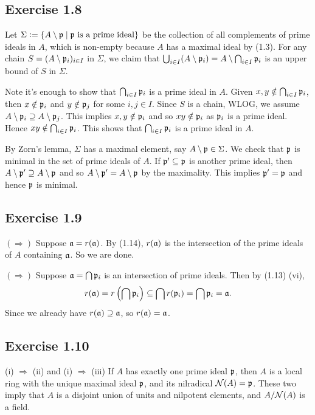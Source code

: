 \documentclass[../A&M.tex]{subfiles}
\begin{document}
\subsection*{Exercise 1.8}

Let $\Sigma:=\{A\setminus\mathfrak{p} \mid \mathfrak{p} \text{ is a prime ideal}\}$ be the collection of all complements of prime ideals in $A$, which is non-empty because $A$ has a maximal ideal by (1.3). For any chain $S=(A\setminus\mathfrak{p}_i)_{i\in I}$ in $\Sigma$, we claim that $\bigcup_{i\in I} (A\setminus\mathfrak{p}_i) = A\setminus \bigcap_{i\in I} \mathfrak{p}_i$ is an upper bound of $S$ in $\Sigma$.

Note it's enough to show that $\bigcap_{i\in I} \mathfrak{p}_i$ is a prime ideal in $A$. Given $x,y \notin \bigcap_{i\in I} \mathfrak{p}_i$, then $x\notin \mathfrak{p}_i$ and $y\notin\mathfrak{p}_j$ for some $i,j\in I$. Since $S$ is a chain, WLOG, we assume $A\setminus\mathfrak{p}_i \supseteq A\setminus\mathfrak{p}_j$. This implies $x,y\notin \mathfrak{p}_i$ and so $xy\notin\mathfrak{p}_i$ as $\mathfrak{p}_i$ is a prime ideal. Hence $xy\notin \bigcap_{i\in I} \mathfrak{p}_i$. This shows that $\bigcap_{i\in I} \mathfrak{p}_i$ is a prime ideal in $A$.

By Zorn's lemma, $\Sigma$ has a maximal element, say $A\setminus\mathfrak{p} \in \Sigma$. We check that $\mathfrak{p}$ is minimal in the set of prime ideals of $A$. If $\mathfrak{p}' \subseteq \mathfrak{p}$ is another prime ideal, then $A\setminus\mathfrak{p}' \supseteq A\setminus\mathfrak{p}$ and so $A\setminus\mathfrak{p}' = A\setminus\mathfrak{p}$ by the maximality. This implies $\mathfrak{p}'=\mathfrak{p}$ and hence $\mathfrak{p}$ is minimal.

\subsection*{Exercise 1.9}

$(\Rightarrow)$ Suppose $\mathfrak{a}=r(\mathfrak{a})$. By (1.14), $r(\mathfrak{a})$ is the intersection of the prime ideals of $A$ containing $\mathfrak{a}$. So we are done.

$(\Rightarrow)$ Suppose $\mathfrak{a}=\bigcap \mathfrak{p}_i$ is an intersection of prime ideals. Then by (1.13) (vi),
$$
r(\mathfrak{a}) = r\left( \bigcap \mathfrak{p}_i \right) \subseteq \bigcap r(\mathfrak{p}_i) = \bigcap \mathfrak{p}_i = \mathfrak{a}.
$$
Since we already have $r(\mathfrak{a})\supseteq\mathfrak{a}$, so $r(\mathfrak{a})=\mathfrak{a}$.

\subsection*{Exercise 1.10}

(i) $\Rightarrow$ (ii) and (i) $\Rightarrow$ (iii) If $A$ has exactly one prime ideal $\mathfrak{p}$, then $A$ is a local ring with the unique maximal ideal $\mathfrak{p}$, and its nilradical $\mathcal{N}(A)=\mathfrak{p}$. These two imply that $A$ is a disjoint union of units and nilpotent elements, and $A/\mathcal{N}(A)$ is a field.
\end{document}
